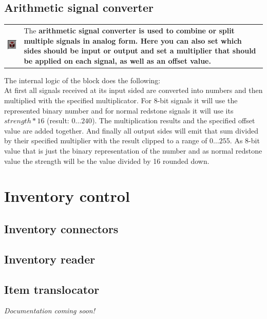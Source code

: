 \documentclass[11pt]{article} %
\makeatletter
\newcommand{\imgtex}{\begin{tabularx}{\textwidth}{@{}c@{ }X@{}}}
\makeatother
\begin{document}
\subsection{Arithmetic signal converter}
\imgtex
\includegraphics[align = t]{arithmetic_op} & The \bf arithmetic signal converter \rm is used to combine or split multiple signals in analog form. Here you can also set which sides should be input or output and set a multiplier that should be applied on each signal, as well as an offset value.\\
\end{tabularx}

The internal logic of the block does the following:\\
At first all signals received at its input sided are converted into numbers and then multiplied with the specified multiplicator. For 8-bit signals it will use the represented binary number and for normal redstone signals it will use its $strength * 16$ (result: $0\dots240$).
The multiplication results and the specified offset value are added together. And finally all output sides will emit that sum divided by their specified multiplier with the result clipped to a range of $0\dots255$. As 8-bit value that is just the binary representation of the number and as normal redstone value the strength will be the value divided by 16 rounded down.

\section{Inventory control}
\subsection{Inventory connectors}
\subsection{Inventory reader}
\subsection{Item translocator}
\it Documentation coming soon!\rm
\end{document}
